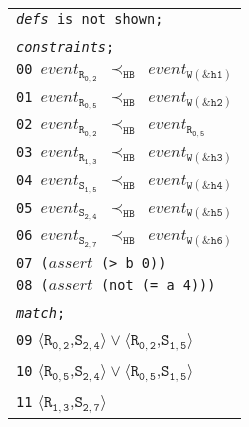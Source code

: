 \newsavebox{\boxSMTc}
\begin{lrbox}{\boxSMTc}
\normalsize
\begin{tabular}[t]{l}
\texttt{\textit{defs} is not shown;}\\
\\
\texttt{\textit{constraints};}\\
\texttt{00 $\mathit{event_\mathtt{R_{0,2}}}$ $\mathtt{\prec_\mathtt{HB}}$ $\mathit{event_\mathtt{W(\&h1)}}$}\\
\texttt{01 $\mathit{event_\mathtt{R_{0,5}}}$ $\mathtt{\prec_\mathtt{HB}}$ $\mathit{event_\mathtt{W(\&h2)}}$}\\
\texttt{02 $\mathit{event_\mathtt{R_{0,2}}}$ $\mathtt{\prec_\mathtt{HB}}$ $\mathit{event_\mathtt{R_{0,5}}}$}\\
\texttt{03 $\mathit{event_\mathtt{R_{1,3}}}$ $\mathtt{\prec_\mathtt{HB}}$ $\mathit{event_\mathtt{W(\&h3)}}$}\\
\texttt{04 $\mathit{event_\mathtt{S_{1,5}}}$ $\mathtt{\prec_\mathtt{HB}}$ $\mathit{event_\mathtt{W(\&h4)}}$}\\
\texttt{05 $\mathit{event_\mathtt{S_{2,4}}}$ $\mathtt{\prec_\mathtt{HB}}$ $\mathit{event_\mathtt{W(\&h5)}}$}\\
\texttt{06 $\mathit{event_\mathtt{S_{2,7}}}$ $\mathtt{\prec_\mathtt{HB}}$ $\mathit{event_\mathtt{W(\&h6)}}$}\\
\texttt{07 ($\mathit{assert}$ (> b 0))}\\
\texttt{08 ($\mathit{assert}$ (not (= a 4)))}\\
\\
\texttt{\textit{match};}\\
\texttt{09} $\langle\mathtt{R_{0,2}}$,$\mathtt{S_{2,4}}\rangle\vee\langle\mathtt{R_{0,2}}$,$\mathtt{S_{1,5}}\rangle$\\
\texttt{10} $\langle\mathtt{R_{0,5}}$,$\mathtt{S_{2,4}}\rangle\vee\langle\mathtt{R_{0,5}}$,$\mathtt{S_{1,5}}\rangle$\\
\texttt{11} $\langle\mathtt{R_{1,3}}$,$\mathtt{S_{2,7}}\rangle$\\

\end{tabular}
\end{lrbox}

